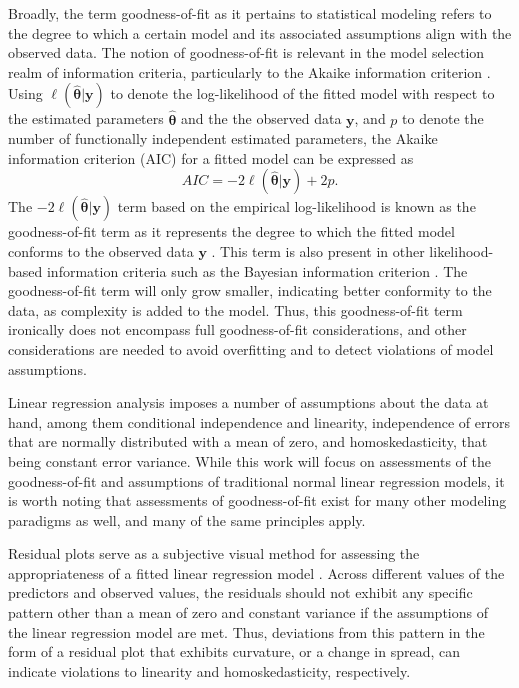 \documentclass[sn-mathphys-ay]{sn-jnl}
\begin{document}
    		Broadly, the term goodness-of-fit as it pertains to statistical modeling refers to the degree to which a certain model
		and its associated assumptions align with the observed data. The notion of goodness-of-fit is relevant in the model selection realm of information criteria, particularly to the Akaike
		information criterion \citep{Akaike}. Using $\ell(\hat{\bm{\theta}}|\bm{y})$ to denote the log-likelihood of the fitted model with respect to the estimated parameters $\hat{\bm{\theta}}$ and the
		the observed data $\bm{y}$, and $p$ to denote the
		number of functionally independent estimated parameters, the Akaike information criterion (AIC) for a fitted model can be expressed as
		\begin{equation*}
			AIC = -2 \ell(\hat{\bm{\theta}}|\bm{y}) + 2 p.
		\end{equation*}
		The $-2 \ell(\hat{\bm{\theta}}|\bm{y})$ term based on the empirical log-likelihood is known as the goodness-of-fit term as it represents the degree to which the fitted model
		conforms to the observed data $\bm{y}$ \citep{Cavanaugh}. This term is also present in other likelihood-based information criteria such as the Bayesian information criterion \citep{Schwarz}.
		The goodness-of-fit term will only grow smaller, indicating better conformity to the data, as complexity is added to the model. Thus, this goodness-of-fit term ironically does
		not encompass full goodness-of-fit considerations, and other considerations are needed to avoid overfitting and to detect violations of model assumptions.

		Linear regression analysis imposes a number of assumptions about the data at hand, among them conditional independence and linearity, independence of errors that are normally distributed with a mean of zero,
		and homoskedasticity, that being constant error variance. While this work will focus on assessments of the goodness-of-fit and assumptions of traditional normal linear regression models, it is worth noting
		that assessments of goodness-of-fit exist for many other modeling paradigms as well, and many of the same principles apply.
		
		Residual plots serve as a subjective visual method for assessing the appropriateness of a fitted linear regression model \citep{Miles}. Across different values
		of the predictors and observed values, the residuals should not exhibit any specific pattern other than a mean of zero and constant variance if the assumptions of the linear regression model are met.
		Thus, deviations from this pattern in the form of a residual plot that exhibits curvature, or a change in spread, can indicate violations to linearity and homoskedasticity, respectively. 
\end{document}
